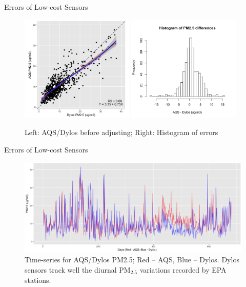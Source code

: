 \documentclass[handout]{beamer} %
\begin{document}
\begin{frame}{Errors of Low-cost Sensors}
    \begin{figure}
        \centering
        \includegraphics[width=0.48\textwidth]{img/appendix/Aim2/scatter_reg.jpg}
        \includegraphics[width=0.48\textwidth]{img/appendix/Aim2/hist.png}
        \caption{Left: AQS/Dylos before adjusting; Right: Histogram of errors}
    \end{figure}
\end{frame}

\begin{frame}{Errors of Low-cost Sensors}
    \begin{figure}
        \centering
        \includegraphics[width=\textwidth]{img/appendix/Aim2/time_series.jpg}
        \caption{Time-series for AQS/Dylos PM2.5; \textcolor[rgb]{1,0,0}{Red} -- AQS, \textcolor[rgb]{0,0,1}{Blue} -- Dylos. Dylos sensors track well the diurnal PM$_{2.5}$ variations recorded by EPA stations.}
    \end{figure}
\end{frame}
\end{document}
